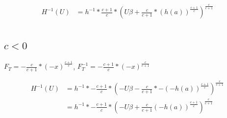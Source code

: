 \documentclass[]{article}
\begin{document}
\begin{align*}
H^{-1}(U) &= h^{-1} * \frac{c + 1}{c} * \left( U\beta + \frac{c}{c + 1} * (h(a))^{\frac{c + 1}{c}} \right)^{\frac{c}{c + 1}} \\
\end{align*}

\subsection{$c < 0$}

$F_T = - \frac{c}{c + 1} * (-x)^{\frac{c + 1}{c}}$,
$F_T^{-1} = - \frac{c + 1}{c} * (-x)^{\frac{c}{c + 1}}$


\begin{align*}
H^{-1}(U) &= h^{-1} * - \frac{c + 1}{c} * \left(- U\beta - \frac{c}{c + 1} * - (-h(a))^{\frac{c + 1}{c}} \right)^{\frac{c}{c + 1}} \\
&= h^{-1} * - \frac{c + 1}{c} * \left(- U\beta + \frac{c}{c + 1} (-h(a))^{\frac{c + 1}{c}} \right)^{\frac{c}{c + 1}} \\
\end{align*}
\end{document}
